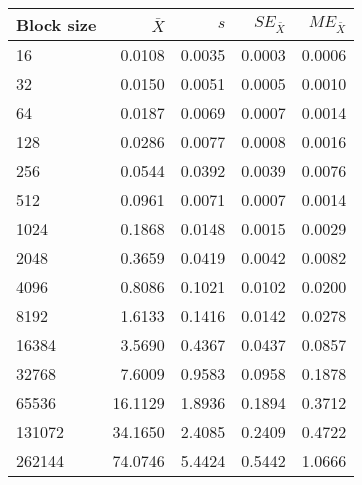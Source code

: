 \begin{tabular}{lrrrr}\toprule
{\small Block size} & $\bar{X}$ & $s$ & $SE_{\bar{X}}$ & $ME_{\bar{X}}$ \\\midrule
16 & 0.0108 & 0.0035 & 0.0003 & 0.0006\\
32 & 0.0150 & 0.0051 & 0.0005 & 0.0010\\
64 & 0.0187 & 0.0069 & 0.0007 & 0.0014\\
128 & 0.0286 & 0.0077 & 0.0008 & 0.0016\\
256 & 0.0544 & 0.0392 & 0.0039 & 0.0076\\
512 & 0.0961 & 0.0071 & 0.0007 & 0.0014\\
1024 & 0.1868 & 0.0148 & 0.0015 & 0.0029\\
2048 & 0.3659 & 0.0419 & 0.0042 & 0.0082\\
4096 & 0.8086 & 0.1021 & 0.0102 & 0.0200\\
8192 & 1.6133 & 0.1416 & 0.0142 & 0.0278\\
16384 & 3.5690 & 0.4367 & 0.0437 & 0.0857\\
32768 & 7.6009 & 0.9583 & 0.0958 & 0.1878\\
65536 & 16.1129 & 1.8936 & 0.1894 & 0.3712\\
131072 & 34.1650 & 2.4085 & 0.2409 & 0.4722\\
262144 & 74.0746 & 5.4424 & 0.5442 & 1.0666\\
\bottomrule
\end{tabular}
